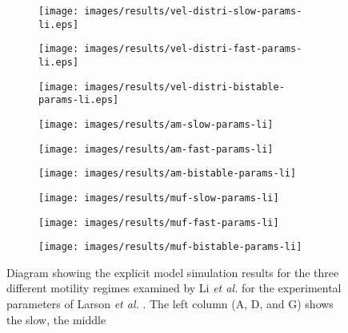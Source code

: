 \newpage
\renewcommand{\thesubfigure}{\Alph{subfigure}}
\begin{figure}
\centering
\captionsetup[subfigure]{justification=justified,singlelinecheck=false,labelformat=simple}
\begin{subfigure}{0.3\textwidth}
 \subcaption{}
 \texttt{[image: images/results/vel-distri-slow-params-li.eps]}
\end{subfigure}
\begin{subfigure}{0.3\textwidth}
 \subcaption{}
 \texttt{[image: images/results/vel-distri-fast-params-li.eps]}
\end{subfigure}
\begin{subfigure}{0.3\textwidth}
 \subcaption{}
 \texttt{[image: images/results/vel-distri-bistable-params-li.eps]}
\end{subfigure}
\begin{subfigure}{0.3\textwidth}
 \subcaption{}
 \texttt{[image: images/results/am-slow-params-li]}
\end{subfigure}
\begin{subfigure}{0.3\textwidth}
 \subcaption{}
 \texttt{[image: images/results/am-fast-params-li]}
\end{subfigure}
\begin{subfigure}{0.3\textwidth}
 \subcaption{}
 \texttt{[image: images/results/am-bistable-params-li]}
\end{subfigure}
\begin{subfigure}{0.3\textwidth}
 \subcaption{}
 \texttt{[image: images/results/muf-slow-params-li]}
\end{subfigure}
\begin{subfigure}{0.3\textwidth}
 \subcaption{}
 \texttt{[image: images/results/muf-fast-params-li]}
\end{subfigure}
\begin{subfigure}[a]{0.3\textwidth}
 \subcaption{}
 \texttt{[image: images/results/muf-bistable-params-li]}
\end{subfigure}
\caption[Simulation results for velocity and motor distributions for the parameters of Larson \textit{et al.} and the three motility regimes found by Li \textit{et al.}]{Diagram showing the explicit model simulation results
for the three different motility regimes examined by Li \textit{et al.} \cite{li} for the experimental parameters of Larson \textit{et al.} \cite{larson}. The left column (A, D, and G) shows the slow, the middle
}
\end{figure}
